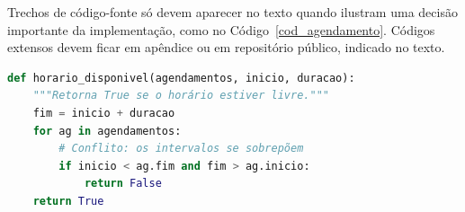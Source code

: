 Trechos de código-fonte só devem aparecer no texto quando ilustram uma decisão importante da implementação, como no Código~\ref{cod_agendamento}. Códigos extensos devem ficar em apêndice ou em repositório público, indicado no texto.

\begin{codigo}[htb]
	\caption{Verificação de conflito de horários no agendamento (exemplo).}
	\label{cod_agendamento}
\begin{lstlisting}[language=Python]
def horario_disponivel(agendamentos, inicio, duracao):
    """Retorna True se o horário estiver livre."""
    fim = inicio + duracao
    for ag in agendamentos:
        # Conflito: os intervalos se sobrepõem
        if inicio < ag.fim and fim > ag.inicio:
            return False
    return True
\end{lstlisting}
\end{codigo}
